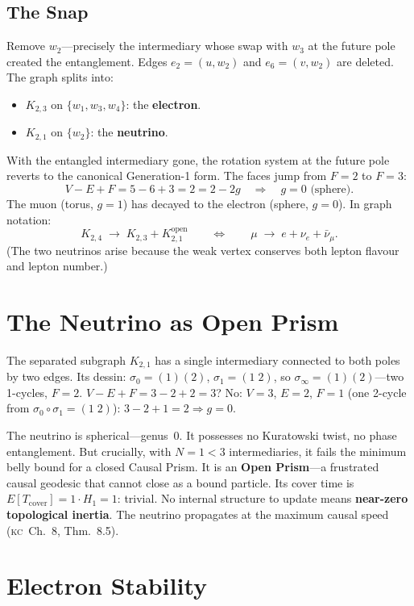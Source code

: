 \documentclass[11pt, a4paper, openany]{book}
\newcommand{\KC}[1]{\textnormal{(\textsc{kc}~#1)}}
\begin{document}
\subsection{The Snap}

Remove $w_2$---precisely the intermediary whose swap with $w_3$ at
the future pole created the entanglement. Edges $e_2 = (u, w_2)$ and
$e_6 = (v, w_2)$ are deleted. The graph splits into:
\begin{itemize}
  \item $K_{2,3}$ on $\{w_1, w_3, w_4\}$: the \textbf{electron}.
  \item $K_{2,1}$ on $\{w_2\}$: the \textbf{neutrino}.
\end{itemize}
With the entangled intermediary gone, the rotation system at the future
pole reverts to the canonical Generation-1 form. The faces jump from
$F = 2$ to $F = 3$:
\[
  V - E + F = 5 - 6 + 3 = 2 = 2 - 2g
  \quad\Longrightarrow\quad \boxed{g = 0}\text{ (sphere).}
\]
The muon (torus, $g = 1$) has decayed to the electron (sphere, $g = 0$).
In graph notation:
\[
  K_{2,4} \;\longrightarrow\; K_{2,3} + K_{2,1}^{\mathrm{open}}
  \qquad\Longleftrightarrow\qquad
  \mu \;\longrightarrow\; e + \nu_e + \bar{\nu}_\mu.
\]
(The two neutrinos arise because the weak vertex conserves both lepton
flavour and lepton number.)

\section{The Neutrino as Open Prism}\label{sec:neutrino-open}

The separated subgraph $K_{2,1}$ has a single intermediary connected to
both poles by two edges. Its dessin:
$\sigma_0 = (1)(2)$, $\sigma_1 = (1\;2)$, so
$\sigma_\infty = (1)(2)$---two 1-cycles, $F = 2$.
$V - E + F = 3 - 2 + 2 = 3$? No: $V = 3$, $E = 2$,
$F = 1$ (one 2-cycle from $\sigma_0 \circ \sigma_1 = (1\;2)$):
$3 - 2 + 1 = 2 \Rightarrow g = 0$.

The neutrino is spherical---genus~0. It possesses no Kuratowski twist,
no phase entanglement. But crucially, with $N = 1 < 3$ intermediaries,
it fails the minimum belly bound for a closed Causal Prism. It is an
\textbf{Open Prism}---a frustrated causal geodesic that cannot close
as a bound particle. Its cover time is
$E[T_{\mathrm{cover}}] = 1 \cdot H_1 = 1$: trivial. No internal
structure to update means \textbf{near-zero topological inertia}.
The neutrino propagates at the maximum causal speed \KC{Ch.~8, Thm.~8.5}.

\section{Electron Stability}\label{sec:electron-stable}
\end{document}

